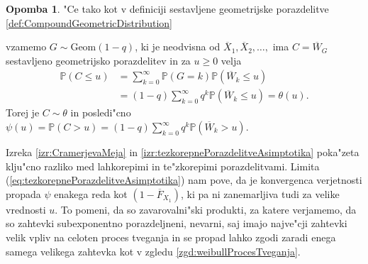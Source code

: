 \documentclass[12pt, a4paper, reqno]{amsart}
\theoremstyle{definition}
\newtheorem{opomba}[definicija]{Opomba}
\theoremstyle{plain}
\newcommand{\Prob}{\mathbb{P}}
\newcommand{\1}{\mathds{1}}
\newcommand*{\refPriloga}[1]{%
  \begingroup
    \hypersetup{
      linkcolor=red,
      linkbordercolor=red,
    }%
    \ref{#1}%
  \endgroup
}
\begin{document}
        \begin{opomba}
            "Ce tako kot v definiciji sestavljene geometrijske porazdelitve \refPriloga{def:CompoundGeometricDistribution} 
            vzamemo $G\sim\text{Geom}(1 - q)$, ki je neodvisna od $\overline{X}_1, \overline{X}_2, \dots,$ ima
            $C = \overline{W}_G$  sestavljeno geometrijsko porazdelitev in za $u\geq0$ velja
            \begin{align*}
             \Prob\left(C \leq u\right)
                    &= \sum_{k = 0}^\infty\Prob\left(G = k\right)\Prob\left(\overline{W}_k \leq u\right) \nonumber\\
                    &= (1 - q)\sum_{k = 0}^\infty q^k\Prob\left(\overline{W}_k \leq u\right) = \theta(u).
            \end{align*}
            Torej je $C\sim \theta$ in posledi"cno $\psi(u) = \Prob\left(C > u\right) = (1-q)\sum_{k=0}^\infty q^k\Prob\left(\overline{W}_k > u\right)$.
            \label{op:tezkorepnePorazdelitveAsimptotika}
        \end{opomba}

        Izreka \ref{izr:CramerjevaMeja} in \ref{izr:tezkorepnePorazdelitveAsimptotika} poka"zeta klju"cno 
        razliko med lahkorepimi in te"zkorepimi porazdelitvami. Limita (\ref{eq:tezkorepnePorazdelitveAsimptotika})
        nam pove, da je konvergenca verjetnosti propada $\psi$ enakega reda kot $(1 - \overline{F}_{X_1})$, ki pa 
        ni zanemarljiva tudi za velike vrednosti $u$. To pomeni, da so zavarovalni"ski produkti, za katere 
        verjamemo, da so zahtevki subexponentno porazdeljneni, nevarni, saj imajo najve"cji zahtevki velik 
        vpliv na celoten proces tveganja in se propad lahko zgodi zaradi enega samega velikega
        zahtevka kot v zgledu \ref{zgd:weibullProcesTveganja}.
\end{document}
